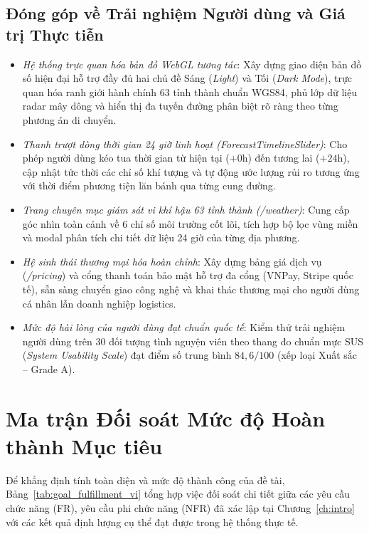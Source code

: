 \subsection{Đóng góp về Trải nghiệm Người dùng và Giá trị Thực tiễn}
\begin{itemize}
    \item[-] \textit{Hệ thống trực quan hóa bản đồ WebGL tương tác}: Xây dựng giao diện bản đồ số hiện đại hỗ trợ đầy đủ hai chủ đề Sáng (\textit{Light}) và Tối (\textit{Dark Mode}), trực quan hóa ranh giới hành chính 63 tỉnh thành chuẩn WGS84, phủ lớp dữ liệu radar mây dông và hiển thị đa tuyến đường phân biệt rõ ràng theo từng phương án di chuyển.
    \item[-] \textit{Thanh trượt dòng thời gian 24 giờ linh hoạt (\textit{ForecastTimelineSlider})}: Cho phép người dùng kéo tua thời gian từ hiện tại ($+0\text{h}$) đến tương lai ($+24\text{h}$), cập nhật tức thời các chỉ số khí tượng và tự động ước lượng rủi ro tương ứng với thời điểm phương tiện lăn bánh qua từng cung đường.
    \item[-] \textit{Trang chuyên mục giám sát vi khí hậu 63 tỉnh thành (\textit{/weather})}: Cung cấp góc nhìn toàn cảnh về 6 chỉ số môi trường cốt lõi, tích hợp bộ lọc vùng miền và modal phân tích chi tiết dữ liệu 24 giờ của từng địa phương.
    \item[-] \textit{Hệ sinh thái thương mại hóa hoàn chỉnh}: Xây dựng bảng giá dịch vụ (\textit{/pricing}) và cổng thanh toán bảo mật hỗ trợ đa cổng (VNPay, Stripe quốc tế), sẵn sàng chuyển giao công nghệ và khai thác thương mại cho người dùng cá nhân lẫn doanh nghiệp logistics.
    \item[-] \textit{Mức độ hài lòng của người dùng đạt chuẩn quốc tế}: Kiểm thử trải nghiệm người dùng trên 30 đối tượng tình nguyện viên theo thang đo chuẩn mực SUS (\textit{System Usability Scale}) đạt điểm số trung bình $84,6 / 100$ (xếp loại Xuất sắc -- Grade A).
\end{itemize}

\section{Ma trận Đối soát Mức độ Hoàn thành Mục tiêu}
\label{sec:goal_fulfillment_matrix}

Để khẳng định tính toàn diện và mức độ thành công của đề tài, Bảng~\ref{tab:goal_fulfillment_vi} tổng hợp việc đối soát chi tiết giữa các yêu cầu chức năng (FR), yêu cầu phi chức năng (NFR) đã xác lập tại Chương~\ref{ch:intro} với các kết quả định lượng cụ thể đạt được trong hệ thống thực tế.

